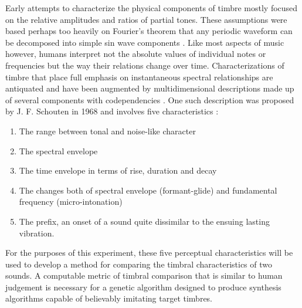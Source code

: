 \documentclass[12pt]{article}
\begin{document}
Early attempts to characterize the physical components of timbre mostly focused on the relative amplitudes and ratios of partial tones. These assumptions were based perhaps too heavily on Fourier's theorem that any periodic waveform can be decomposed into simple sin wave components \citep{helmholtz1857physiological, helmholtz1954sensations}. Like most aspects of music however, humans interpret not the absolute values of individual notes or frequencies but the way their relations change over time. Characterizations of timbre that place full emphasis on instantaneous spectral relationships are antiquated and have been augmented by multidimensional descriptions made up of several components with codependencies \citep{erickson1975sound}. One such description was proposed by J. F. Schouten in 1968 and involves five characteristics \citep{schouten1968perception, erickson1975sound}:
\begin{enumerate}
\item
The range between tonal and noise-like character
\item
The spectral envelope
\item
The time envelope in terms of rise, duration and decay
\item
The changes both of spectral envelope (formant-glide) and fundamental frequency (micro-intonation)
\item
The prefix, an onset of a sound quite dissimilar to the ensuing lasting vibration.
\end{enumerate}

For the purposes of this experiment, these five perceptual characteristics will be used to develop a method for comparing the timbral characteristics of two sounds. A computable metric of timbral comparison that is similar to human judgement is necessary for a genetic algorithm designed to produce synthesis algorithms capable of believably imitating target timbres.
\end{document}
